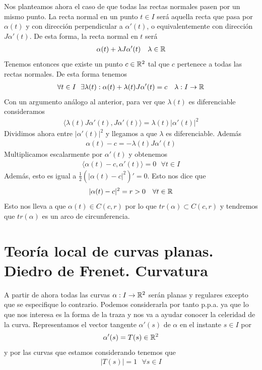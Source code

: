 \begin{ejercicio}
    Nos planteamos ahora el caso de que todas las rectas normales pasen por un mismo punto. La recta normal en un punto $t\in I$ será aquella recta que pasa por $\alpha(t)$ y con dirección perpendicular a $\alpha'(t)$, o equivalentemente con dirección $J\alpha'(t)$. De esta forma, la recta normal en $t$ será 
    \begin{gather*}
        \alpha(t) + \lambda J \alpha'(t)\ \ \ \lambda \in \mathbb{R}
    \end{gather*}
    Tenemos entonces que existe un punto $c\in \mathbb{R}^2$ tal que $c$ pertenece a todas las rectas normales. De esta forma tenemos 
    \begin{gather*}
        \forall t \in I\ \ \exists \lambda(t) : \alpha(t) + \lambda(t)J\alpha'(t) = c\ \ \ \lambda:I\to \mathbb{R}
    \end{gather*}
    Con un argumento análogo al anterior, para ver que $\lambda(t)$ es diferenciable consideramos
    \begin{gather*}
        \langle \lambda(t)J\alpha'(t), J\alpha'(t)\rangle = \lambda(t)|\alpha'(t)|^2
    \end{gather*}
    Dividimos ahora entre $|\alpha'(t)|^2$ y llegamos a que $\lambda$ es diferenciable. Además
    \begin{gather*}
        \alpha(t)-c = -\lambda(t)J\alpha'(t)
    \end{gather*}
    Multiplicamos escalarmente por $\alpha'(t)$ y obtenemos
    \begin{gather*}
        \langle \alpha(t)-c, \alpha'(t) \rangle = 0 \ \ \ \forall t \in I
    \end{gather*}
    Además, esto es igual a $\frac{1}{2}(|\alpha(t)-c|^2)'=0$. Esto nos dice que 
    \begin{gather*}
        |\alpha(t)-c|^2 = r > 0\ \ \ \forall t \in \mathbb{R}
    \end{gather*}
    Esto nos lleva a que $\alpha(t)\in C(c,r)$ por lo que $tr(\alpha)\subset C(c,r)$ y tendremos que $tr(\alpha)$ es un arco de circunferencia.
\end{ejercicio}

\section{Teoría local de curvas planas. Diedro de Frenet. Curvatura}

\begin{notacion}
    A partir de ahora todas las curvas  $\alpha: I \to \mathbb{R}^2$ serán planas y regulares excepto que se especifique lo contrario. Podemos considerarla por tanto p.p.a. ya que lo que nos interesa es la forma de la traza y nos va a ayudar conocer la celeridad de la curva. Representamos el vector tangente $\alpha'(s)$ de $\alpha$ en el instante $s\in I$ por
    \begin{gather*}
        \alpha'(s) = T(s) \in \mathbb{R}^2
    \end{gather*}
    y por las curvas que estamos considerando tenemos que 
    \begin{gather*}
        |T(s)| = 1\ \ \ \forall s \in I
    \end{gather*}
\end{notacion}

